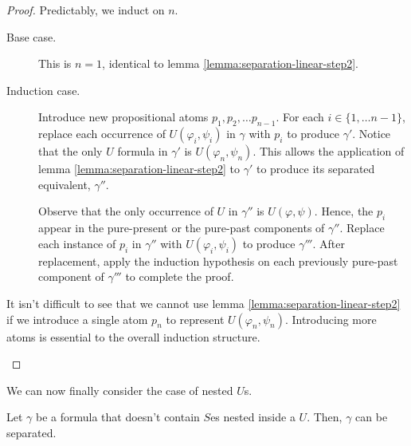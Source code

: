 \documentclass[a4paper,UKenglish,cleveref, autoref, thm-restate, numberwithinsect]{lipics-v2021}
\begin{document}
\begin{proof}
    Predictably, we induct on $n$.
    \begin{description}
        \item[Base case.] This is $n = 1$, identical to lemma \ref{lemma:separation-linear-step2}.
        \item[Induction case.] Introduce new propositional atoms $p_1, p_2, \ldots p_{n-1}$. For each $i \in \{1, \ldots n - 1\}$, replace each occurrence of $U(\varphi_i, \psi_i)$ in $\gamma$ with $p_i$ to produce $\gamma'$. Notice that the only $U$ formula in $\gamma'$ is $U(\varphi_n, \psi_n)$. This allows the application of lemma \ref{lemma:separation-linear-step2} to $\gamma'$ to produce its separated equivalent, $\gamma''$.

        Observe that the only occurrence of $U$ in $\gamma''$ is $U(\varphi, \psi)$. Hence, the $p_i$ appear in the pure-present or the pure-past components of $\gamma''$. Replace each instance of $p_i$ in $\gamma''$ with $U(\varphi_i, \psi_i)$ to produce $\gamma'''$. After replacement, apply the induction hypothesis on each previously pure-past component of $\gamma'''$ to complete the proof.
    \end{description}
    \begin{remark*}
        It isn't difficult to see that we cannot use lemma \ref{lemma:separation-linear-step2} if we introduce a single atom $p_n$ to represent $U(\varphi_n, \psi_n)$. Introducing more atoms is essential to the overall induction structure.
    \end{remark*}
\end{proof}
We can now finally consider the case of nested $U$s.
\begin{lemma}
    \label{lemma:separation-linear-step4}
    Let $\gamma$ be a formula that doesn't contain $S$es nested inside a $U$. Then, $\gamma$ can be separated.
\end{lemma}
\end{document}
